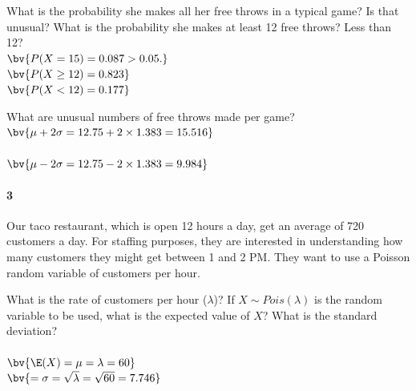 \documentclass{article}
\begin{document}
\begin{flushleft}
\begin{enumalpha}
\vspace{.25in}
\item What is the probability she makes all her free throws in a typical game? Is that unusual? What is the probability she makes at least 12 free throws? Less than 12?\\
\medskip
$\bv{P(X=15) = 0.087 > 0.05.}$\\
\medskip
$\bv{P(X \ge 12 ) = 0.823}$ \\
\medskip
$\bv{P(X < 12 ) = 0.177}$\\

\vspace{.25in}

\item What are unusual numbers of free throws made per game?\\
\medskip
$\bv{\mu + 2 \sigma = 12.75 + 2 \times 1.383 = 15.516}$\\
\\
\medskip
$\bv{ \mu - 2 \sigma = 12.75 - 2 \times 1.383 = 9.984}$\\
\end{enumalpha}

\newpage
\paragraph{3} Our taco restaurant, which is open 12 hours a day, get an average of 720 customers a day. For staffing purposes, they are interested in understanding how many customers they might get between 1 and 2 PM. They want to use a Poisson random variable of customers per hour.
\begin{enumalpha}
\item What is the rate of customers per hour ($\lambda$)? If $X \sim Pois(\lambda)$ is the random variable to be used, what is the expected value of $X$? What is the standard deviation?\\
\medskip
{}\\
\medskip
$\bv{\E(X) = \mu = \lambda = 60}$\\
\medskip
{}$\bv{= \sigma = \sqrt{\lambda} = \sqrt{60} = 7.746}$

\vspace{0.25in}


\end{enumalpha}
\end{flushleft}
\end{document}
